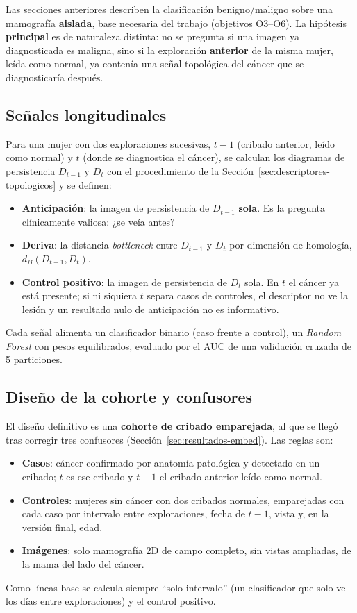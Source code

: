 Las secciones anteriores describen la clasificación benigno/maligno sobre una
mamografía \textbf{aislada}, base necesaria del trabajo (objetivos O3--O6).
La hipótesis \textbf{principal} es de naturaleza distinta: no se pregunta si
una imagen ya diagnosticada es maligna, sino si la exploración
\textbf{anterior} de la misma mujer, leída como normal, ya contenía una
señal topológica del cáncer que se diagnosticaría después.

\subsection{Señales longitudinales}
Para una mujer con dos exploraciones sucesivas, $t-1$ (cribado anterior,
leído como normal) y $t$ (donde se diagnostica el cáncer), se calculan los
diagramas de persistencia $D_{t-1}$ y $D_t$ con el procedimiento de la
Sección~\ref{sec:descriptores-topologicos} y se definen:
\begin{itemize}
  \item \textbf{Anticipación}: la imagen de persistencia de $D_{t-1}$
        \textbf{sola}. Es la pregunta clínicamente valiosa: ¿se veía antes?
  \item \textbf{Deriva}: la distancia \textit{bottleneck} entre $D_{t-1}$ y
        $D_t$ por dimensión de homología, $d_B(D_{t-1}, D_t)$.
  \item \textbf{Control positivo}: la imagen de persistencia de $D_t$ sola.
        En $t$ el cáncer ya está presente; si ni siquiera $t$ separa casos de
        controles, el descriptor no ve la lesión y un resultado nulo de
        anticipación no es informativo.
\end{itemize}
Cada señal alimenta un clasificador binario (caso frente a control), un
\textit{Random Forest} con pesos equilibrados, evaluado por el AUC de una
validación cruzada de 5 particiones.

\subsection{Diseño de la cohorte y confusores}
El diseño definitivo es una \textbf{cohorte de cribado emparejada}, al que
se llegó tras corregir tres confusores (Sección~\ref{sec:resultados-embed}).
Las reglas son:
\begin{itemize}
  \item \textbf{Casos}: cáncer confirmado por anatomía patológica y
        detectado en un cribado; $t$ es ese cribado y $t-1$ el cribado
        anterior leído como normal.
  \item \textbf{Controles}: mujeres sin cáncer con dos cribados normales,
        emparejadas con cada caso por intervalo entre exploraciones, fecha
        de $t-1$, vista y, en la versión final, edad.
  \item \textbf{Imágenes}: solo mamografía 2D de campo completo, sin vistas
        ampliadas, de la mama del lado del cáncer.
\end{itemize}
Como líneas base se calcula siempre ``solo intervalo'' (un clasificador que
solo ve los días entre exploraciones) y el control positivo.

